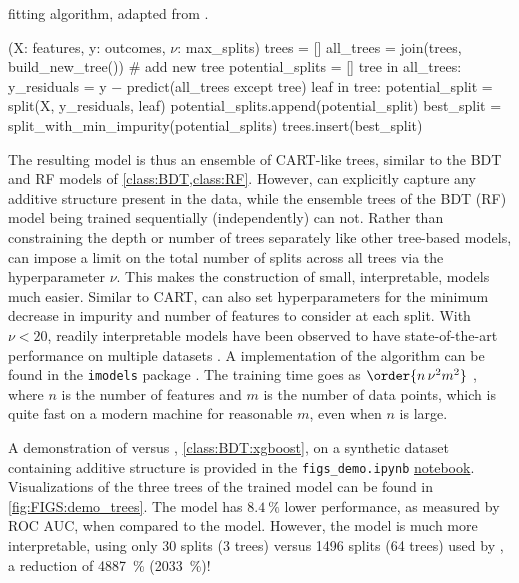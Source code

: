 \begin{algorithm}[h]
  \caption{\figs fitting algorithm, adapted from \cite{FIGS}.}
  \label{algo:FIGS:fit_algo}
  \small
\begin{algorithmic}
  \State {\figs}(X: features, y: outcomes, $\nu$: max\_splits)
  \State trees = []
    \State all\_trees = join(trees, build\_new\_tree()) \textcolor{codegreen}{\# add new tree}
    \State potential\_splits = []
    \For{}\hspace{-3pt}tree in all\_trees:
        \State y\_residuals = y $-$ predict(all\_trees except tree)
        \For{}\hspace{-3pt}leaf in tree:
            \State potential\_split = split(X, y\_residuals, leaf)
            \State potential\_splits.append(potential\_split)
        \EndFor
    \EndFor
    \State best\_split = split\_with\_min\_impurity(potential\_splits)
    \State trees.insert(best\_split)
  \EndWhile
\end{algorithmic}
\end{algorithm}

The resulting \figs model is thus an ensemble of CART-like trees,
similar to the BDT and RF models of \cref{class:BDT,class:RF}.
However, \figs can explicitly capture any additive structure present in the data,
while the ensemble trees of the BDT (RF) model being trained sequentially (independently) can not.
Rather than constraining the depth or number of trees separately like other tree-based models,
\figs can impose a limit on the total number of splits across all trees via the hyperparameter $\nu$.
This makes the construction of small, interpretable, models much easier.
Similar to CART, \figs can also set hyperparameters for
the minimum decrease in impurity and
number of features to consider at each split.
With $\nu < 20$, readily interpretable \figs models have been observed
to have state-of-the-art performance on multiple datasets \cite{FIGS}.
A \python implementation of the \figs algorithm can be found in the \texttt{imodels} package \cite{imodels}.
The \figs training time goes as $\order{n \, \nu^{2} m^{2}}$ \cite{FIGS},
where $n$ is the number of features and $m$ is the number of data points,
which is quite fast on a modern machine for reasonable $m$, even when $n$ is large.

A demonstration of \figs versus \xgboost, \cref{class:BDT:xgboost},
on a synthetic dataset containing additive structure
is provided in the \texttt{figs\_demo.ipynb} \href{https://github.com/mepland/data_science_notes/blob/main/plots/figs_demo.ipynb}{notebook}.
Visualizations of the three trees of the trained \figs model can be found in \cref{fig:FIGS:demo_trees}.
The \figs model has $\SI{8.4}{\percent}$ lower performance, as measured by ROC AUC, when compared to the \xgboost model.
However, the \figs model is much more interpretable,
using only \num{30} splits (\num{3} trees) versus \num{1496} splits (\num{64} trees) used by \xgboost,
a reduction of \SI{4887}{\percent} (\SI{2033}{\percent})!

